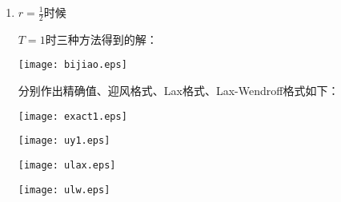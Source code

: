 \documentclass{ctexart}
\begin{document}
\begin{enumerate}
\begin{enumerate}
\item $r=\frac{1}{2}$时候

$T=1$时三种方法得到的解：

\centerline{\texttt{[image: bijiao.eps]}}

分别作出精确值、迎风格式、Lax格式、Lax-Wendroff格式如下：

\centerline{\texttt{[image: exact1.eps]}}

\centerline{\texttt{[image: uy1.eps]}}

\centerline{\texttt{[image: ulax.eps]}}

\centerline{\texttt{[image: ulw.eps]}}

\end{enumerate}



\end{enumerate}
\end{document}
